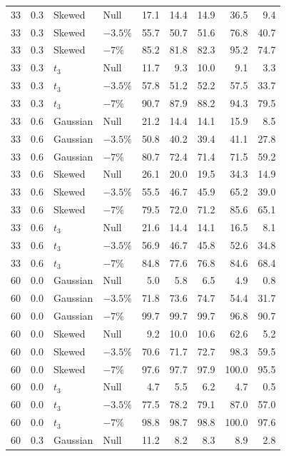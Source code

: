 \begin{longtable}{rrllrrrrr}
33 & 0.3 & Skewed & Null & 17.1 & 14.4 & 14.9 & 36.5 & 9.4 \\
33 & 0.3 & Skewed & $-3.5\%$ & 55.7 & 50.7 & 51.6 & 76.8 & 40.7 \\
33 & 0.3 & Skewed & $-7\%$ & 85.2 & 81.8 & 82.3 & 95.2 & 74.7 \\
33 & 0.3 & $t_3$ & Null & 11.7 & 9.3 & 10.0 & 9.1 & 3.3 \\
33 & 0.3 & $t_3$ & $-3.5\%$ & 57.8 & 51.2 & 52.2 & 57.5 & 33.7 \\
33 & 0.3 & $t_3$ & $-7\%$ & 90.7 & 87.9 & 88.2 & 94.3 & 79.5 \\
33 & 0.6 & Gaussian & Null & 21.2 & 14.4 & 14.1 & 15.9 & 8.5 \\
33 & 0.6 & Gaussian & $-3.5\%$ & 50.8 & 40.2 & 39.4 & 41.1 & 27.8 \\
33 & 0.6 & Gaussian & $-7\%$ & 80.7 & 72.4 & 71.4 & 71.5 & 59.2 \\
33 & 0.6 & Skewed & Null & 26.1 & 20.0 & 19.5 & 34.3 & 14.9 \\
33 & 0.6 & Skewed & $-3.5\%$ & 55.5 & 46.7 & 45.9 & 65.2 & 39.0 \\
33 & 0.6 & Skewed & $-7\%$ & 79.5 & 72.0 & 71.2 & 85.6 & 65.1 \\
33 & 0.6 & $t_3$ & Null & 21.6 & 14.4 & 14.1 & 16.5 & 8.1 \\
33 & 0.6 & $t_3$ & $-3.5\%$ & 56.9 & 46.7 & 45.8 & 52.6 & 34.8 \\
33 & 0.6 & $t_3$ & $-7\%$ & 84.8 & 77.6 & 76.8 & 84.6 & 68.4 \\
60 & 0.0 & Gaussian & Null & 5.0 & 5.8 & 6.5 & 4.9 & 0.8 \\
60 & 0.0 & Gaussian & $-3.5\%$ & 71.8 & 73.6 & 74.7 & 54.4 & 31.7 \\
60 & 0.0 & Gaussian & $-7\%$ & 99.7 & 99.7 & 99.7 & 96.8 & 90.7 \\
60 & 0.0 & Skewed & Null & 9.2 & 10.0 & 10.6 & 62.6 & 5.2 \\
60 & 0.0 & Skewed & $-3.5\%$ & 70.6 & 71.7 & 72.7 & 98.3 & 59.5 \\
60 & 0.0 & Skewed & $-7\%$ & 97.6 & 97.7 & 97.9 & 100.0 & 95.5 \\
60 & 0.0 & $t_3$ & Null & 4.7 & 5.5 & 6.2 & 4.7 & 0.5 \\
60 & 0.0 & $t_3$ & $-3.5\%$ & 77.5 & 78.2 & 79.1 & 87.0 & 57.0 \\
60 & 0.0 & $t_3$ & $-7\%$ & 98.8 & 98.7 & 98.8 & 100.0 & 97.6 \\
60 & 0.3 & Gaussian & Null & 11.2 & 8.2 & 8.3 & 8.9 & 2.8 \\

\end{longtable}
